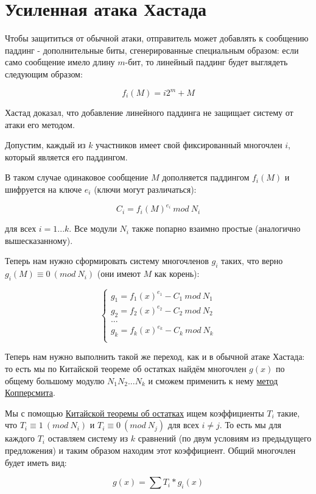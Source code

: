 \documentclass[12pt,a4paper]{scrartcl}
\begin{document}
\section{Усиленная атака Хастада}

Чтобы защититься от обычной атаки, отправитель может добавлять к сообщению паддинг - дополнительные биты, сгенерированные специальным образом:
если само сообщение имело длину $m$-бит, то линейный паддинг будет выглядеть следующим образом:

$$f_i(M) = i 2^m + M$$

Хастад доказал, что добавление линейного паддинга не защищает систему от атаки его методом.

Допустим, каждый из $k$ участников имеет свой фиксированный многочлен $i$, который является его паддингом.

В таком случае одинаковое сообщение $M$  дополняется паддингом $f_i(M)$ и шифруется на ключе $e_i$ (ключи могут различаться):

$$C_i = f_i(M)^{e_i}\ mod\ N_i$$

для всех $i=1...k$. Все модули $N_i$ также попарно взаимно простые (аналогично вышесказанному).

Теперь нам нужно сформировать систему многочленов $g_i$ таких, что верно $g_i(M)\equiv 0\ (mod\ N_i)$ (они имеют $M$  как корень):


$$\begin{cases} g_1 = f_1(x)^{e_1} - C_1\ mod\ N_1\\ g_2 = f_2(x)^{e_2} - C_2\ mod\ N_2\\...\\ g_k = f_k(x)^{e_k} - C_k\ mod\ N_k\\ \end{cases}$$

Теперь нам нужно выполнить такой же переход, как и в обычной атаке Хастада: то есть мы по Китайской теореме об остатках найдём многочлен $g(x)$ по общему большому модулю $N_1N_2...N_k$ и сможем применить к нему \href{https://yatb.kksctf.ru/}{метод Копперсмита}.

Мы с помощью \href{https://yatb.kksctf.ru/}{Китайской теоремы об остатках} ищем коэффициенты $T_i$ такие, что $T_i \equiv 1\ (mod\ N_i)$ и $T_i \equiv 0\ (mod\ N_j)$ для всех $i\neq j$. То есть мы для каждого $T_i$ оставляем систему из $k$ сравнений (по двум условиям из предыдущего предложения) и таким образом находим этот коэффициент. Общий многочлен будет иметь вид:

$$g(x)= \sum T_i*g_i(x)$$
\end{document}
